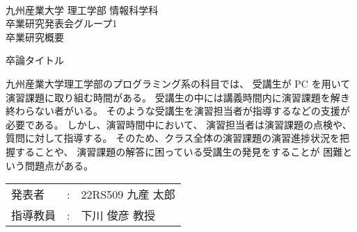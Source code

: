 \documentclass[uplatex,a4paper,12pt]{jsarticle}
\title
\renewcommand{\author}[1]{\def\author{#1}}
\renewcommand{\title}[1]{\def\title{#1}}
\newcommand{\supervisor}[1]{\def\supervisor{#1}}
\newcommand{\group}[1]{\def\group{#1}}
\newcommand{\makeheader}{
\vspace*{-20mm}
\noindent\\九州産業大学 理工学部 情報科学科
\noindent\\卒業研究発表会グループ\group
\noindent\\卒業研究概要
\vskip 10mm
\begin{center}
  \title 
\end{center}
\vskip 5mm
}
\newcommand{\maketailer}{
\vfill
\begin{center}
\setlength{\tabcolsep}{1mm}
\begin{tabular}[h]{p{4zw}p{1em}l}
 発\hfill{}表\hfill{}者&:& \author\\
 指導教員&:& \supervisor
\end{tabular}
\end{center}
}
\newenvironment{rsabst}{\makeheader}{\maketailer}
\begin{document}
\title{卒論タイトル}
\author{22RS509 九産 太郎}
\supervisor{下川 俊彦 教授}
\group{1}

\begin{rsabst}


九州産業大学理工学部のプログラミング系の科目では、
受講生が PC を用いて演習課題に取り組む時間がある。
受講生の中には講義時間内に演習課題を解き終わらない者がいる。
そのような受講生を演習担当者が指導するなどの支援が必要である。
しかし、演習時間中において、
演習担当者は演習課題の点検や、
質問に対して指導する。
そのため、クラス全体の演習課題の演習進捗状況を把握することや、
演習課題の解答に困っている受講生の発見をすることが
困難という問題点がある。

\end{rsabst}
\end{document}
